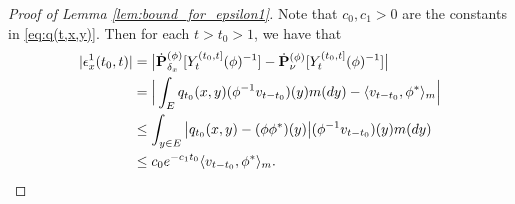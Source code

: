 \documentclass[12pt,a4paper]{amsart}
\theoremstyle{definition}
\numberwithin{equation}{section}
\begin{document}
\begin{proof}
  [Proof of Lemma \ref{lem:bound_for_epsilon1}]
  Note that $c_0, c_1>0$ are the constants in \eqref{eq:q(t,x,y)}.
  Then for each $t > t_0 > 1$, we have that
  \begin{align}
    |\epsilon_x^1(t_0,t)|
    & = \big| \dot {\mathbf P}_{\delta_x}^{(\phi)} [Y^{(t_0,t]}_t(\phi)^{-1}] - \dot {\mathbf P}_\nu^{(\phi)} [Y^{(t_0,t]}_t(\phi)^{-1}] \big| \\
    & = \Big|  \int_E  q_{t_0}(x,y)(\phi^{-1}v_{t-t_0})(y) m(dy) - \langle v_{t-t_0},\phi^* \rangle_m \Big|\\
    & \leq \int_{y\in E} \big| q_{t_0}(x,y) - (\phi\phi^*)(y) \big| (\phi^{-1}v_{t-t_0})(y) m(dy)\\
    & \leq c_0 e^{-c_1 t_0}\langle v_{t-t_0},\phi^* \rangle_m.
    \qedhere
  \end{align}
\end{proof}
\end{document}
